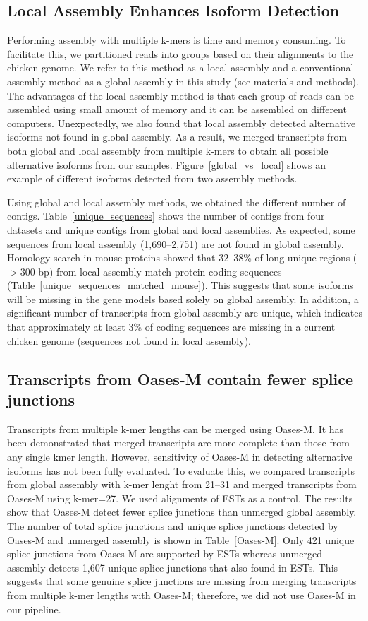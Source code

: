\documentclass[10pt]{article}
\begin{document}
\subsection*{Local Assembly Enhances Isoform Detection}

Performing assembly with multiple k-mers is time and memory consuming.
To facilitate this, we partitioned reads into groups based on their alignments to the chicken genome.
We refer to this method as a local assembly and a conventional assembly method as a global assembly in this study (see materials and methods).
The advantages of the local assembly method is that each group of reads can be assembled using small amount of memory and it can be assembled on different computers.
Unexpectedly, we also found that local assembly detected alternative isoforms not found in global assembly.
As a result, we merged transcripts from both global and local assembly from multiple k-mers to obtain all possible alternative isoforms from our samples.
Figure~\ref{global_vs_local} shows an example of different isoforms detected from two assembly methods.

Using global and local assembly methods, we obtained the different number of contigs.
Table~\ref{unique_sequences} shows the number of contigs from four datasets and unique contigs from global and local assemblies.
As expected, some sequences from local assembly (1,690--2,751) are not found in global assembly.
Homology search in mouse proteins showed that 32--38\% of long unique regions ($>300$ bp) from local assembly match protein
coding sequences (Table~\ref{unique_sequences_matched_mouse}).
This suggests that some isoforms will be missing in the gene models based solely on global assembly.
In addition, a significant number of transcripts from global assembly are unique, which indicates that
approximately at least 3\% of coding sequences are missing in a current chicken genome (sequences not found in local assembly).

\subsection*{Transcripts from Oases-M contain fewer splice junctions}
Transcripts from multiple k-mer lengths can be merged using Oases-M.
It has been demonstrated that merged transcripts are more complete than those from any single kmer length\cite{Schulz:2012je}.
However, sensitivity of Oases-M in detecting alternative isoforms has not been fully evaluated.
To evaluate this, we compared transcripts from global assembly with k-mer lenght from 21--31 and merged transcripts from Oases-M using k-mer=27. We used alignments of ESTs as a control.
The results show that Oases-M detect fewer splice junctions than unmerged global assembly.
The number of total splice junctions and unique splice junctions detected by Oases-M and unmerged assembly is
shown in Table~\ref{Oases-M}.
Only 421 unique splice junctions from Oases-M are supported by ESTs whereas unmerged assembly detects 1,607
unique splice junctions that also found in ESTs.
This suggests that some genuine splice junctions are missing from merging transcripts from multiple k-mer
lengths with Oases-M; therefore, we did not use Oases-M in our pipeline.
\end{document}
